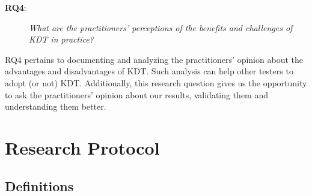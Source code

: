 \begin{description}
\item[\textbf{RQ4}:] \emph{What are the practitioners' perceptions of the
    benefits and challenges of KDT in practice?}
\end{description}

RQ4 pertains to documenting and analyzing the practitioners' opinion about the advantages and disadvantages of KDT. Such analysis can help other testers to adopt (or not) KDT. Additionally, this research question gives us the opportunity to ask the practitioners' opinion about our results, validating them and understanding them better.

\section{Research Protocol}

\subsection{Definitions}
\label{sec:evolution-protocol-definitions}

